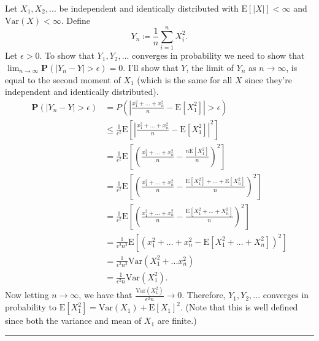 \documentclass{article}
\theoremstyle{break}
\renewenvironment{proof}{{\bf Proof:}}{\hfill\rule{2mm}{2mm}}
\newcommand{\E}{\mathrm{E}}
\newcommand{\var}{\mathrm{Var}}
\renewcommand{\P}{\mathbf{P}}
\begin{document}
\begin{proof}
  Let $X_1, X_2, ...$ be independent and identically distributed with $\E[|X|] < \infty$ and $\var(X) < \infty$. Define
  \[
    Y_n \coloneqq \frac{1}{n} \sum_{i=1}^n X_i^2.
  \]
  Let $\epsilon > 0$. To show that $Y_1, Y_2, ...$ converges in probability we need to show that $\lim_{n \rightarrow \infty} \P(|Y_n - Y| > \epsilon) = 0$. I'll show that $Y$, the limit of $Y_n$ as $n \rightarrow \infty$, is equal to the second moment of $X_1$ (which is the same for all $X$ since they're independent and identically distributed).
  \begin{align*}
    \P(|Y_n - Y| > \epsilon) &= P\left( \left| \frac{x_1^2 + ... + x_n^2}{n} - \E[X_1^2] \right| > \epsilon \right) \\
    &\leq \frac{1}{\epsilon^2} \E\left[ \left| \frac{x_1^2 + ... + x_n^2}{n} - \E[X_1^2] \right|^2 \right] \\
    &= \frac{1}{\epsilon^2} \E\left[ \left( \frac{x_1^2 + ... + x_n^2}{n} - \frac{n\E[X_1^2]}{n} \right)^2 \right] \\
    &= \frac{1}{\epsilon^2} \E\left[ \left( \frac{x_1^2 + ... + x_n^2}{n} - \frac{\E[X_1^2] + ... + \E[X_n^2]}{n} \right)^2 \right] \\
    &= \frac{1}{\epsilon^2} \E\left[ \left( \frac{x_1^2 + ... + x_n^2}{n} - \frac{\E[X_1^2 + ... + X_n^2]}{n} \right)^2 \right] \\
    &= \frac{1}{\epsilon^2 n^2} \E\left[ \left( x_1^2 + ... + x_n^2 - \E[X_1^2 + ... + X_n^2] \right)^2 \right] \\
    &= \frac{1}{\epsilon^2 n^2} \var(X_1^2 + ... x_n^2) \\
    &= \frac{1}{\epsilon^2 n} \var(X_1^2).
  \end{align*}
  Now letting $n \rightarrow \infty$, we have that $\frac{\var(X_1^2)}{\epsilon^2 n} \rightarrow 0$. Therefore, $Y_1, Y_2, ...$ converges in probability to $\E[X_1^2] = \var(X_1) + \E[X_1]^2$. (Note that this is well defined since both the variance and mean of $X_1$ are finite.)
\end{proof}
\end{document}
